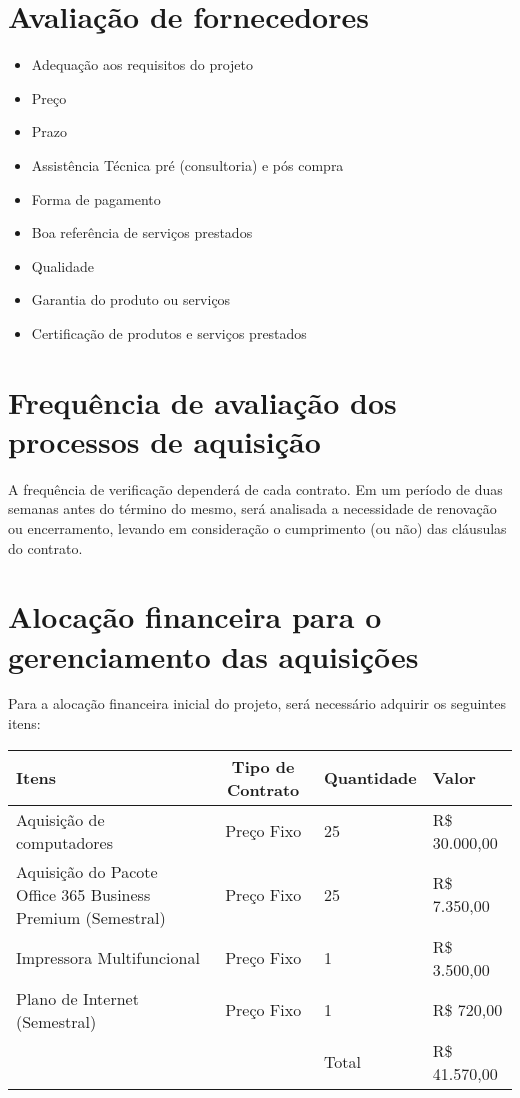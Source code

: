 \section*{Avaliação de fornecedores}
\begin{itemize}
\item Adequação aos requisitos do projeto
\item Preço
\item Prazo
\item Assistência Técnica pré (consultoria) e pós compra
\item Forma de pagamento
\item Boa referência de serviços prestados
\item Qualidade
\item Garantia do produto ou serviços
\item Certificação de produtos e serviços prestados
\end{itemize}

\section*{Frequência de avaliação dos processos de aquisição}
A frequência de verificação dependerá de cada contrato. Em um período de duas semanas antes do término do mesmo, será analisada a necessidade de renovação ou encerramento, levando em consideração o cumprimento (ou não) das cláusulas do contrato.

\section*{Alocação financeira para o gerenciamento das aquisições}
Para a alocação financeira  inicial do projeto, será necessário adquirir os seguintes itens:
\begin{table}[h]
\centering
\begin{tabular}{|p{7cm}|c|p{2cm}|p{2.5cm}|}
Itens & Tipo de Contrato & Quantidade & Valor\\
\hline
Aquisição de computadores & Preço Fixo	& 25 & R\$ 30.000,00 \\
\hline
Aquisição do Pacote Office 365 Business Premium (Semestral)	& Preço Fixo & 25 & R\$ 7.350,00\\
\hline
Impressora Multifuncional & Preço Fixo & 1 & R\$ 3.500,00\\
\hline
Plano de Internet (Semestral) & Preço Fixo & 1 & R\$ 720,00\\
\hline
 & & Total & R\$ 41.570,00
\end{tabular}
\end{table}

